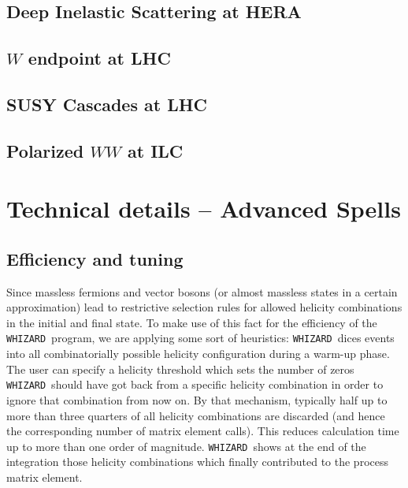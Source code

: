 \documentclass[12pt]{book}
\newcommand{\ttt}[1]{\texttt{#1}}
\newcommand{\whizard}{\ttt{WHIZARD}}
\begin{document}

\section{Deep Inelastic Scattering at HERA}


\section{$W$ endpoint at LHC}


\section{SUSY Cascades at LHC}


\section{Polarized $WW$ at ILC}


\chapter{Technical details -- Advanced Spells}
\label{chap:tuning}

\section{Efficiency and tuning}

Since massless fermions and vector bosons (or almost massless states
in a certain approximation) lead to restrictive selection rules for
allowed helicity combinations in the initial and final state. To make
use of this fact for the efficiency of the \whizard\ program, we are
applying some sort of heuristics: \whizard\ dices events into all
combinatorially possible helicity configuration during a warm-up
phase. The user can specify a helicity threshold which sets the number
of zeros \whizard\ should have got back from a specific helicity
combination in order to ignore that combination from now on. By that
mechanism, typically half up to more than three quarters of all
helicity combinations are discarded (and hence the corresponding
number of matrix element calls). This reduces calculation time up to
more than one order of magnitude. \whizard\ shows at the end of the
integration those helicity combinations which finally contributed to
the process matrix element.
\end{document}
